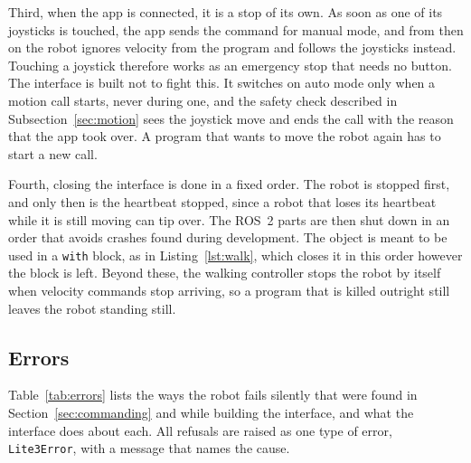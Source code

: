 Third, when the app is connected, it is a stop of its own. As soon as one of its joysticks is touched, the app sends
the command for manual mode, and from then on the robot ignores velocity from the program and follows the
joysticks instead. Touching a joystick therefore works as an emergency stop that needs no button. The
interface is built not to fight this. It switches on auto mode only when a motion call starts, never during
one, and the safety check described in Subsection~\ref{sec:motion} sees the joystick move and ends the call
with the reason that the app took over. A program that wants to move the robot again has to start a new call.

Fourth, closing the interface is done in a fixed order. The robot is stopped first, and only then is the
heartbeat stopped, since a robot that loses its heartbeat while it is still moving can tip over. The
ROS~2 parts are then shut down in an order that avoids crashes found during development. The object is meant
to be used in a \texttt{with} block, as in Listing~\ref{lst:walk}, which closes it in this order however the
block is left. Beyond these, the walking controller stops the robot by itself when velocity commands stop
arriving, so a program that is killed outright still leaves the robot standing still.

\subsection{Errors}
\label{sec:errors}

Table~\ref{tab:errors} lists the ways the robot fails silently that were found in
Section~\ref{sec:commanding} and while building the interface, and what the interface does about each. All
refusals are raised as one type of error, \texttt{Lite3Error}, with a message that names the cause.

